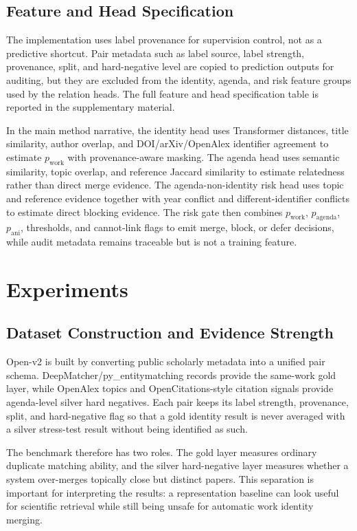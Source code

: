\documentclass[11pt]{article}
\begin{document}
\subsection{Feature and Head Specification}

The implementation uses label provenance for supervision control, not as a predictive shortcut. Pair metadata such as label source, label strength, provenance, split, and hard-negative level are copied to prediction outputs for auditing, but they are excluded from the identity, agenda, and risk feature groups used by the relation heads. The full feature and head specification table is reported in the supplementary material.

In the main method narrative, the identity head uses Transformer distances, title similarity, author overlap, and DOI/arXiv/OpenAlex identifier agreement to estimate $p_{\mathrm{work}}$ with provenance-aware masking. The agenda head uses semantic similarity, topic overlap, and reference Jaccard similarity to estimate relatedness rather than direct merge evidence. The agenda-non-identity risk head uses topic and reference evidence together with year conflict and different-identifier conflicts to estimate direct blocking evidence. The risk gate then combines $p_{\mathrm{work}}$, $p_{\mathrm{agenda}}$, $p_{\mathrm{ani}}$, thresholds, and cannot-link flags to emit merge, block, or defer decisions, while audit metadata remains traceable but is not a training feature.

\section{Experiments}

\subsection{Dataset Construction and Evidence Strength}

Open-v2 is built by converting public scholarly metadata into a unified pair schema. DeepMatcher/py\_entitymatching records provide the same-work gold layer, while OpenAlex topics and OpenCitations-style citation signals provide agenda-level silver hard negatives. Each pair keeps its label strength, provenance, split, and hard-negative flag so that a gold identity result is never averaged with a silver stress-test result without being identified as such.

The benchmark therefore has two roles. The gold layer measures ordinary duplicate matching ability, and the silver hard-negative layer measures whether a system over-merges topically close but distinct papers. This separation is important for interpreting the results: a representation baseline can look useful for scientific retrieval while still being unsafe for automatic work identity merging.
\end{document}
